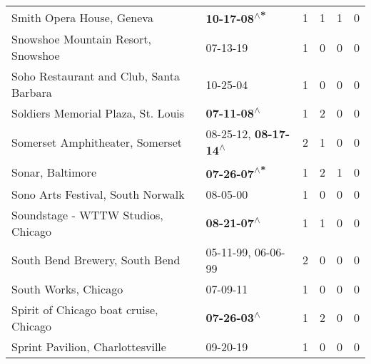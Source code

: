 \begin{supertabular}{p{0.4\textwidth}p{0.3\textwidth}p{0.05\textwidth}p{0.05\textwidth}p{0.05\textwidth}p{0.05\textwidth}}
                                                    Smith Opera House, Geneva &                                                \textbf{10-17-08\textsuperscript{$\wedge$*}} &  1 &  1 &  1 &  0 \\
                                           Snowshoe Mountain Resort, Snowshoe &                                                                  07-13-19\textsuperscript{} &  1 &  0 &  0 &  0 \\
                                      Soho Restaurant and Club, Santa Barbara &                                                                  10-25-04\textsuperscript{} &  1 &  0 &  0 &  0 \\
                                           Soldiers Memorial Plaza, St. Louis &                                                 \textbf{07-11-08\textsuperscript{$\wedge$}} &  1 &  2 &  0 &  0 \\
                                              Somerset Amphitheater, Somerset &                     08-25-12\textsuperscript{}, \textbf{08-17-14\textsuperscript{$\wedge$}} &  2 &  1 &  0 &  0 \\
                                                             Sonar, Baltimore &                                                \textbf{07-26-07\textsuperscript{$\wedge$*}} &  1 &  2 &  1 &  0 \\
                                            Sono Arts Festival, South Norwalk &                                                                  08-05-00\textsuperscript{} &  1 &  0 &  0 &  0 \\
                                           Soundstage - WTTW Studios, Chicago &                                                 \textbf{08-21-07\textsuperscript{$\wedge$}} &  1 &  1 &  0 &  0 \\
                                               South Bend Brewery, South Bend &                                      05-11-99\textsuperscript{}, 06-06-99\textsuperscript{} &  2 &  0 &  0 &  0 \\
                                                         South Works, Chicago &                                                                  07-09-11\textsuperscript{} &  1 &  0 &  0 &  0 \\
                                       Spirit of Chicago boat cruise, Chicago &                                                 \textbf{07-26-03\textsuperscript{$\wedge$}} &  1 &  2 &  0 &  0 \\
                                             Sprint Pavilion, Charlottesville &                                                                  09-20-19\textsuperscript{} &  1 &  0 &  0 &  0 \\

\end{supertabular}
